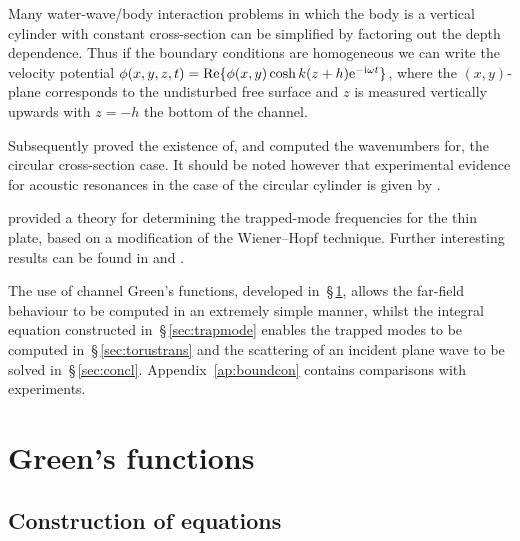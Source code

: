 \documentclass{jfm}
\newcommand\etal{\mbox{\textit{et al.}}}
\begin{document}
Many water-wave/body interaction problems in which the body is a
vertical cylinder with constant cross-section can be simplified by
factoring out the depth dependence. Thus if the boundary conditions
are homogeneous we can write the velocity potential
$\phi(x,y,z,t) =
 \hbox{Re}\{\phi(x,y)\cosh k(z+h)\mathrm{e}^{-\mathrm{i}\omega t}\}$,
where the $(x,y)$-plane corresponds to the undisturbed free surface and
$z$ is measured vertically upwards with $z=-h$ the bottom of the channel.

Subsequently \cite[Callan \etal\ (1991)]{Callan91} proved the existence of,
and computed the wavenumbers for, the circular cross-section case.
It should be noted however that experimental evidence for acoustic
resonances in the case of the circular cylinder is given by
\cite[Bearman \& Graham (1980, pp.~231--232)]{Bearman80}.

\mbox{}\cite{Koch83} provided a theory for determining the trapped-mode
frequencies for the thin plate, based on a modification of the Wiener--Hopf
technique. Further interesting results can be found in \cite{Williams64}
and \cite{Dennis85}.

The use of channel Green's functions, developed in~\S\,\ref{sec:greenfun},
allows the far-field behaviour to be computed in an extremely simple manner,
whilst the integral equation constructed in~\S\,\ref{sec:trapmode} enables
the trapped modes to be computed in~\S\,\ref{sec:torustrans} and the
scattering of an incident plane wave to be solved in~\S\,\ref{sec:concl}.
Appendix~\ref{ap:boundcon} contains comparisons with experiments.


\section{Green's functions}\label{sec:greenfun}

\subsection{Construction of equations}
\end{document}
